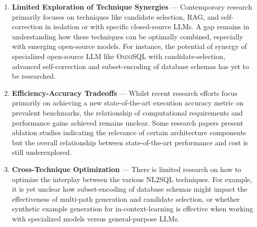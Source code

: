 \begin{enumerate}
    \item \textbf{Limited Exploration of Technique Synergies} — Contemporary research primarily focuses on techniques like
          candidate selection, RAG, and self-correction in isolation or with specific closed-source LLMs. A gap remains
          in understanding how these techniques can be optimally combined, especially with emerging open-source models.
          For instance, the potential of synergy of specialized open-source LLM like \textsc{OmniSQL} with candidate-selection,
          advanced self-correction and subset-encoding of database schemas has yet to be researched.
    \item \textbf{Efficiency-Accuracy Tradeoffs} — Whilst recent research efforts focus primarily on achieving a new
          state-of-the-art execution accuracy metric on prevalent benchmarks, the relationship of computational requirements and
          performance gains achieved remains unclear. Some research papers present ablation studies indicating the relevance
          of certain architecture components but the overall relationship between state-of-the-art performance and cost
          is still underexplored. 
     \item \textbf{Cross-Technique Optimization} — There is limited research on how to optimize the interplay between the various
          NL2SQL techniques. For example, it is yet unclear how subset-encoding of database schemas might impact the effectiveness
          of multi-path generation and candidate selection, or whether synthetic example generation for in-context-learning is 
          effective when working with specialized models versus general-purpose LLMs.
\end{enumerate}

